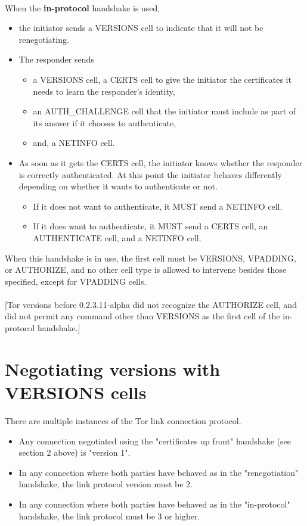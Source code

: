 \paragraph{}
When the \textbf{in-protocol} handshake is used,
\begin{itemize}
    \item the initiator sends a VERSIONS cell to indicate that it will not be renegotiating.
    \item The responder sends
    \begin{itemize}
        \item a VERSIONS cell, a CERTS cell to give the
        initiator the certificates it needs to learn the responder's
        identity,
        \item an AUTH\_CHALLENGE cell that the initiator must include
        as part of its answer if it chooses to authenticate,
        \item and, a NETINFO cell.
    \end{itemize}

    \item As soon as it gets the CERTS cell, the initiator knows
    whether the responder is correctly authenticated. At this point the
    initiator behaves differently depending on whether it wants to
    authenticate or not.
    \begin{itemize}
        \item If it does not want to authenticate, it MUST send a NETINFO cell.
        \item If it does want to authenticate, it MUST send a CERTS cell,
        an AUTHENTICATE cell, and a NETINFO cell.
    \end{itemize}
\end{itemize}
When this handshake is in use, the first cell must be VERSIONS, VPADDING, or
AUTHORIZE, and no other cell type is allowed to intervene besides
those specified, except for VPADDING cells.

\paragraph{}
[Tor versions before 0.2.3.11-alpha did not recognize the AUTHORIZE cell,
and did not permit any command other than VERSIONS as the first cell of
the in-protocol handshake.]


\section{Negotiating versions with VERSIONS cells}
There are multiple instances of the Tor link connection protocol.
\begin{itemize}
    \item
    Any connection negotiated using the "certificates up front" handshake (see
    section 2 above) is "version 1".
    \item In any connection where both parties
    have behaved as in the "renegotiation" handshake, the link protocol
    version must be 2.
    \item In any connection where both parties have behaved
    as in the "in-protocol" handshake, the link protocol must be 3 or higher.
\end{itemize}

